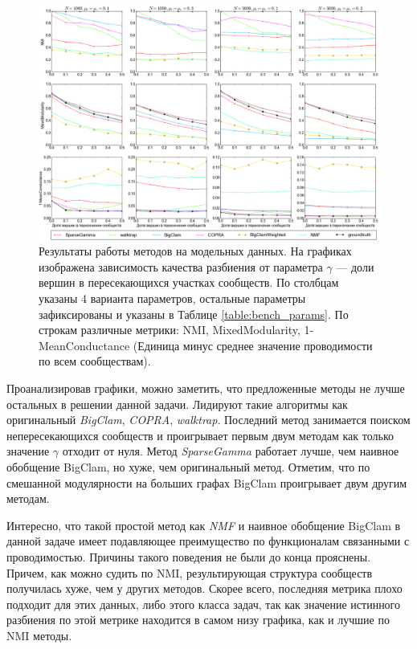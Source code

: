 \documentclass{ITaSconf}
\begin{document}
	\begin{figure}[!t]
		\centering
		\includegraphics[width=\textwidth]{imgs/experiments_all.png}
		\caption{Результаты работы методов на модельных данных. На графиках изображена зависимость качества разбиения от параметра $\gamma$ --- доли вершин в пересекающихся участках сообществ. По столбцам указаны 4 варианта параметров, остальные параметры зафиксированы и указаны в Таблице \ref{table:bench_params}. По строкам различные метрики: NMI, MixedModularity, 1-MeanConductance (Единица минус среднее значение проводимости по всем сообществам).}
		\label{fig:experiments}
	\end{figure}
	
	Проанализировав графики, можно заметить, что предложенные методы не лучше остальных в решении данной задачи. Лидируют такие алгоритмы как оригинальный \textit{BigClam}, \textit{COPRA}, \textit{walktrap}. Последний метод занимается поиском непересекающихся сообществ и проигрывает первым двум методам как только значение $\gamma$ отходит от нуля.
	Метод \textit{SparseGamma} работает лучше, чем наивное обобщение BigClam, но хуже, чем оригинальный метод. 
	Отметим, что по смешанной модулярности на больших графах BigClam проигрывает двум другим методам. 
	
	Интересно, что такой простой метод как \textit{NMF} и наивное обобщение BigClam в данной задаче имеет подавляющее преимущество по функционалам связанными с проводимостью. Причины такого поведения не были до конца прояснены.
	Причем, как можно судить по NMI, результирующая структура сообществ получилась хуже, чем у других методов. 
	Скорее всего, последняя метрика плохо подходит для этих данных, либо этого класса задач, так как значение истинного разбиения по этой метрике находится в самом низу графика, как и лучшие по NMI методы.
	
\end{document}
